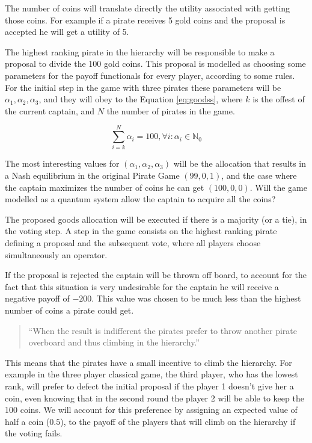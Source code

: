 The number of coins will translate directly the utility associated with getting those coins. For example if a pirate receives 5 gold coins and the proposal is accepted he will get a utility of 5. 

The highest ranking pirate in the hierarchy will be responsible to make a proposal to divide the 100 gold coins. This proposal is modelled as choosing some parameters for the payoff functionals for every player, according to some rules. For the initial step in the game with three pirates these parameters will be $\alpha_{1}, \alpha_{2}, \alpha_{3}$, and they will obey to the Equation \ref{eq:goodss}, where $k$ is the offest of the current captain, and $N$ the number of pirates in the game. 

\begin{equation}
\label{eq:goodss}
\sum_{i=k}^{N}\alpha_{i}=100, \forall i :\alpha_{i}\in\mathbb{N}_{0}
\end{equation}

The most interesting values for $(\alpha_{1}, \alpha_{2}, \alpha_{3})$ will be the allocation that results in a Nash equilibrium in the original Pirate Game $(99, 0, 1)$, and the case where the captain maximizes the number of coins he can get $(100, 0, 0)$. Will the game modelled as a quantum system allow the captain to acquire all the coins?

The proposed goods allocation will be executed if there is a majority (or a tie), in the voting step. A step in the game consists on the highest ranking pirate defining a proposal and the subsequent vote, where all players choose simultaneously an operator. 

If the proposal is rejected the captain will be thrown off board, to account for the fact that this situation is very undesirable for the captain he will receive a negative payoff of $-200$. This value was chosen to be much less than the highest number of coins a pirate could get.

\begin{quotation}
``When the result is indifferent the pirates prefer to throw another pirate overboard and thus climbing in the hierarchy.''
\end{quotation}

This means that the pirates have a small incentive to climb the hierarchy. For example in the three player classical game, the third player, who has the lowest rank, will prefer to defect the initial proposal if the player 1 doesn't give her a coin, even knowing that in the second round the player 2 will be able to keep the 100 coins. We will account for this preference by assigning an expected value of half a coin ($0.5$), to the payoff of the players that will climb on the hierarchy if the voting fails.

